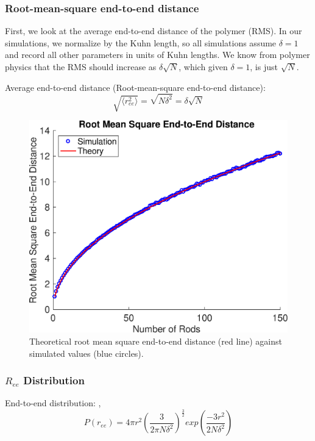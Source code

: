 \documentclass[../AdvancementSummary.tex]{subfiles}
\begin{document}
\subsubsection{Root-mean-square end-to-end distance}
First, we look at the average end-to-end distance of the polymer (RMS). In our simulations, we normalize by the Kuhn length, so all simulations assume $\delta = 1$ and record all other parameters in units of Kuhn lengths.  We know from polymer physics that the RMS should increase as $\delta \sqrt{N}$, which given $\delta = 1$, is just $\sqrt{N}$.

Average end-to-end distance (Root-mean-square end-to-end distance):  \cite{Reeves2011}
\begin{equation*}
\sqrt{\langle r_{ee}^2 \rangle} = \sqrt{N\delta^2} = \delta \sqrt{N}
\end{equation*}

\begin{figure}[H]
\begin{center}
\includegraphics[width=0.5\linewidth]{ModelConfirmationFigures/RMSEndtoEnd.eps}
\caption{Theoretical root mean square end-to-end distance (red line) against simulated values (blue circles). \label{fig: RMS}}
\end{center}
\end{figure}

\subsubsection{$R_{ee}$ Distribution}

End-to-end distribution: \cite{VanValen2009}, \cite{Reeves2011}
\begin{equation*}
P(r_{ee}) = 4\pi r^2 \left( \frac{3}{2\pi N \delta^2}\right)^{\frac{3}{2}}exp\left(\frac{-3r^2}{2N \delta^2}\right)
\end{equation*}
\end{document}

